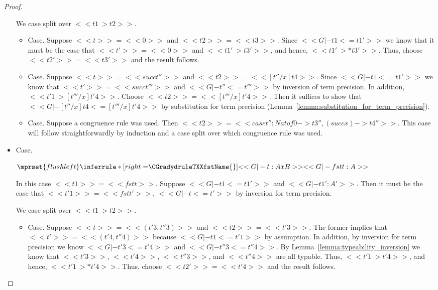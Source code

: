 \begin{proof}
\begin{itemize}
    We case split over $<<t1 ~> t2>>$.
    \begin{itemize}
    \item[] Case.  Suppose $<<t>> = <<0>>$ and $<<t2>> = <<t3>>$.  Since $<<G |- t1 <= t1'>>$ we know that
      it must be the case that $<<t'>> = <<0>>$ and $<<t1' ~> t3'>>$, and hence,
      $<<t1' ~>* t3'>>$.  Thus, choose $<<t2'>> = <<t3'>>$ and the result follows.
      
    \item[] Case.  Suppose $<<t>> = <<succ t''>>$ and $<<t2>> = << [t''/x]t4>>$.  Since $<<G |- t1 <= t1'>>$
      we know that $<<t'>> = <<succ t'''>>$ and $<<G |- t'' <= t'''>>$ by inversion of term precision. In addition,
      $<<t'1 ~> [t'''/x]t'4>>$. Choose $<<t2>> = << [t'''/x]t'4>>$.  Then it suffices to show that
      $<<G |- [t''/x]t4 <= [t'''/x]t'4>>$ by substitution for term precision (Lemma~\ref{lemma:substitution_for_term_precision}).            
      
    \item[] Case.  Suppose a congruence rule was used.  Then $<<t2>> = <<case t'' : Nat of 0 -> t3'', (succ x) -> t4''>>$.
      This case will follow straightforwardly by induction and a case split over which congruence rule was used.
      
    \end{itemize}   

  \item[] Case.\ \\ 
    \begin{center}
      \begin{math}
        $$\mprset{flushleft}
        \inferrule* [right=$\CGradydruleTXXfstName{}$] {
          <<G |- t : A x B>>
        }{<<G |- fst t : A>>}
      \end{math}
    \end{center}
    In this case $<<t1>> = <<fst t>>$.  Suppose $<<G |- t1 <= t1'>>$ and $<<G |- t1' : A'>>$.  Then
    it must be the case that $<<t'1>> = <<fst t'>>$, $<<G |- t <= t'>>$ by inversion for term
    precision.

    We case split over $<<t1 ~> t2>>$.
    \begin{itemize}
    \item[] Case. Suppose $<<t>> = <<(t'3,t''3)>>$ and $<<t2>> = <<t'3>>$.  The former implies
      that $<<t'>> = <<(t'4,t''4)>>$ because $<<G |- t1 <= t'1>>$ by assumption.  In addition,
      by inversion for term precision we know $<<G |- t'3 <= t'4>>$ and $<<G |- t''3 <= t''4>>$.
      By Lemma~\ref{lemma:typeability_inversion} we know that $<<t'3>>$, $<<t'4>>$, $<<t''3>>$, and
      $<<t''4>>$ are all typable.  Thus, $<<t'1 ~> t'4>>$, and hence, $<<t'1 ~>* t'4>>$. Thus, choose
      $<<t2'>> = <<t'4>>$ and the result follows.


\end{itemize}
\end{itemize}
\end{proof}
